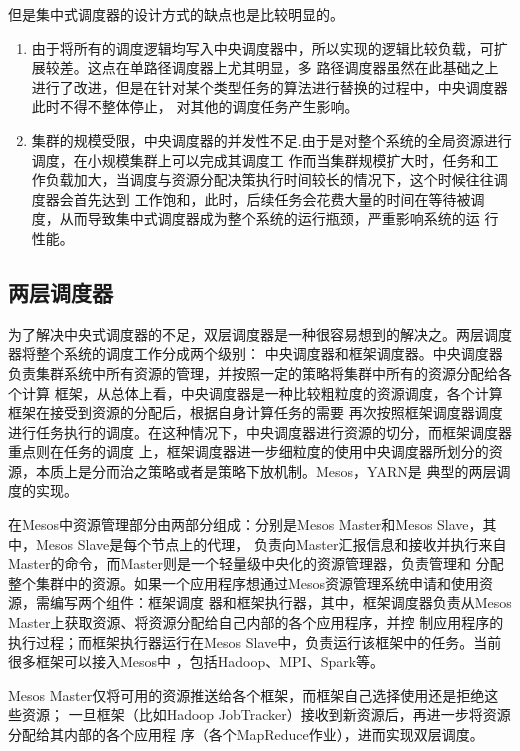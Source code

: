 但是集中式调度器的设计方式的缺点也是比较明显的。
\begin{enumerate}
\item 由于将所有的调度逻辑均写入中央调度器中，所以实现的逻辑比较负载，可扩展较差。这点在单路径调度器上尤其明显，多
路径调度器虽然在此基础之上进行了改进，但是在针对某个类型任务的算法进行替换的过程中，中央调度器此时不得不整体停止，
对其他的调度任务产生影响。
\item 集群的规模受限，中央调度器的并发性不足.由于是对整个系统的全局资源进行调度，在小规模集群上可以完成其调度工
作而当集群规模扩大时，任务和工作负载加大，当调度与资源分配决策执行时间较长的情况下，这个时候往往调度器会首先达到
工作饱和，此时，后续任务会花费大量的时间在等待被调度，从而导致集中式调度器成为整个系统的运行瓶颈，严重影响系统的运
行性能。
\end{enumerate}

\subsection{两层调度器}
为了解决中央式调度器的不足，双层调度器是一种很容易想到的解决之。两层调度器将整个系统的调度工作分成两个级别：
中央调度器和框架调度器。中央调度器负责集群系统中所有资源的管理，并按照一定的策略将集群中所有的资源分配给各个计算
框架，从总体上看，中央调度器是一种比较粗粒度的资源调度，各个计算框架在接受到资源的分配后，根据自身计算任务的需要
再次按照框架调度器调度进行任务执行的调度。在这种情况下，中央调度器进行资源的切分，而框架调度器重点则在任务的调度
上，框架调度器进一步细粒度的使用中央调度器所划分的资源，本质上是分而治之策略或者是策略下放机制。Mesos，YARN是
典型的两层调度的实现。

在Mesos中资源管理部分由两部分组成：分别是Mesos Master和Mesos Slave，其中，Mesos Slave是每个节点上的代理，
负责向Master汇报信息和接收并执行来自Master的命令，而Master则是一个轻量级中央化的资源管理器，负责管理和
分配整个集群中的资源。如果一个应用程序想通过Mesos资源管理系统申请和使用资源，需编写两个组件：框架调度
器和框架执行器，其中，框架调度器负责从Mesos Master上获取资源、将资源分配给自己内部的各个应用程序，并控
制应用程序的执行过程；而框架执行器运行在Mesos Slave中，负责运行该框架中的任务。当前很多框架可以接入Mesos中
，包括Hadoop、MPI、Spark等。

Mesos Master仅将可用的资源推送给各个框架，而框架自己选择使用还是拒绝这些资源；
一旦框架（比如Hadoop JobTracker）接收到新资源后，再进一步将资源分配给其内部的各个应用程
序（各个MapReduce作业），进而实现双层调度。

